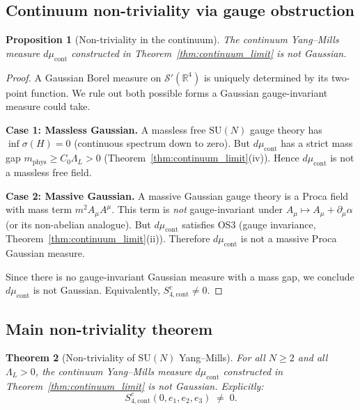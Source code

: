 \documentclass[11pt,a4paper]{amsart}
\newtheorem{theorem}{Theorem}[section]
\newtheorem{proposition}[theorem]{Proposition}
\theoremstyle{definition}
\newcommand{\SU}{\mathrm{SU}}
\newcommand{\R}{\mathbb{R}}
\begin{document}
\subsection{Continuum non-triviality via gauge obstruction}
\label{sec:nontrivial_continuum}

\begin{proposition}[Non-triviality in the continuum]
\label{prop:nontrivial_cont}
The continuum Yang--Mills measure $d\mu_{\mathrm{cont}}$ constructed in
Theorem~\ref{thm:continuum_limit} is not Gaussian.
\end{proposition}

\begin{proof}
A Gaussian Borel measure on $\mathcal{S}'(\R^4)$ is uniquely determined by its
two-point function.  We rule out both possible forms a Gaussian gauge-invariant
measure could take.

\textbf{Case 1: Massless Gaussian.}
A massless free $\SU(N)$ gauge theory has $\inf\sigma(H) = 0$ (continuous
spectrum down to zero).  But $d\mu_{\mathrm{cont}}$ has a strict mass gap
$m_{\mathrm{phys}} \ge C_0\Lambda_L > 0$ (Theorem~\ref{thm:continuum_limit}(iv)).
Hence $d\mu_{\mathrm{cont}}$ is not a massless free field.

\textbf{Case 2: Massive Gaussian.}
A massive Gaussian gauge theory is a Proca field with mass term $m^2 A_\mu A^\mu$.
This term is \emph{not} gauge-invariant under $A_\mu \mapsto A_\mu + \partial_\mu\alpha$
(or its non-abelian analogue).  But $d\mu_{\mathrm{cont}}$ satisfies OS3
(gauge invariance, Theorem~\ref{thm:continuum_limit}(ii)).  Therefore
$d\mu_{\mathrm{cont}}$ is not a massive Proca Gaussian measure.

Since there is no gauge-invariant Gaussian measure with a mass gap, we conclude
$d\mu_{\mathrm{cont}}$ is not Gaussian.  Equivalently, $S_{4,\mathrm{cont}}^c \ne 0$.
\end{proof}

\subsection{Main non-triviality theorem}
\label{sec:nontrivial_main}

\begin{theorem}[Non-triviality of $\SU(N)$ Yang--Mills]
\label{thm:nontrivial}
For all $N\ge 2$ and all $\Lambda_L > 0$, the continuum Yang--Mills measure
$d\mu_{\mathrm{cont}}$ constructed in Theorem~\ref{thm:continuum_limit} is not Gaussian.
Explicitly:
\[
  S_{4,\mathrm{cont}}^c(0,e_1,e_2,e_3) \;\ne\; 0.
\]
\end{theorem}
\end{document}
